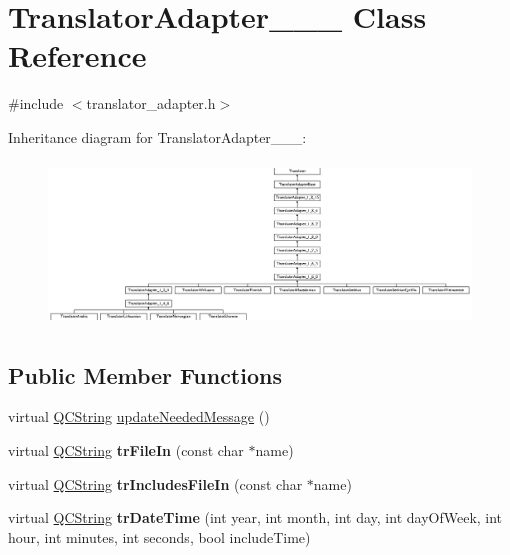 \hypertarget{class_translator_adapter__1__6__3}{}\section{Translator\+Adapter\+\_\+\_\+\_ Class Reference}
\label{class_translator_adapter__1__6__3}


{\ttfamily \#include $<$translator\+\_\+adapter.\+h$>$}

Inheritance diagram for Translator\+Adapter\+\_\+\_\+\_\+:\begin{figure}[H]
\begin{center}
\leavevmode
\includegraphics[height=4.366472cm]{class_translator_adapter__1__6__3}
\end{center}
\end{figure}
\subsection*{Public Member Functions}
\begin{DoxyCompactItemize}
\item 
virtual \mbox{\hyperlink{class_q_c_string}{Q\+C\+String}} \mbox{\hyperlink{class_translator_adapter__1__6__3_ab3d79abfb926c41bd7609eeb706654fe}{update\+Needed\+Message}} ()
\item 
\mbox{\label{class_translator_adapter__1__6__3_a3645d77e245f76891d9926254208e840}} 
virtual \mbox{\hyperlink{class_q_c_string}{Q\+C\+String}} {\bfseries tr\+File\+In} (const char $\ast$name)
\item 
\mbox{\label{class_translator_adapter__1__6__3_a3f0eecc876597e903d6dd557a72e598f}} 
virtual \mbox{\hyperlink{class_q_c_string}{Q\+C\+String}} {\bfseries tr\+Includes\+File\+In} (const char $\ast$name)
\item 
\mbox{\label{class_translator_adapter__1__6__3_a9a4db38fc5d4ddb87a9ac244fd6cef27}} 
virtual \mbox{\hyperlink{class_q_c_string}{Q\+C\+String}} {\bfseries tr\+Date\+Time} (int year, int month, int day, int day\+Of\+Week, int hour, int minutes, int seconds, bool include\+Time)
\end{DoxyCompactItemize}
